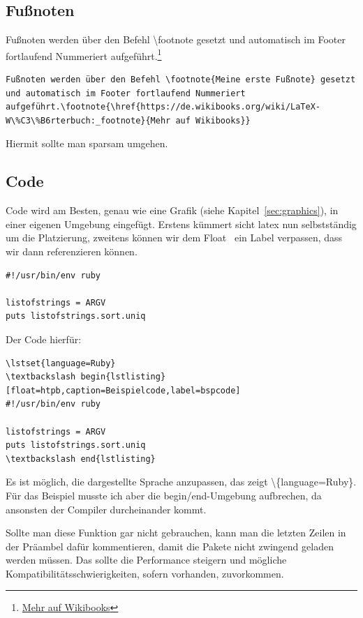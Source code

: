\subsection{Fußnoten}
\label{sec:footn}
Fußnoten werden über den Befehl \textbackslash footnote gesetzt und automatisch im Footer fortlaufend Nummeriert aufgeführt.\footnote{\href{https://de.wikibooks.org/wiki/LaTeX-W\%C3\%B6rterbuch:_footnote}{Mehr auf Wikibooks}}
\begin{lstlisting}
Fußnoten werden über den Befehl \footnote{Meine erste Fußnote} gesetzt und automatisch im Footer fortlaufend Nummeriert aufgeführt.\footnote{\href{https://de.wikibooks.org/wiki/LaTeX-W\%C3\%B6rterbuch:_footnote}{Mehr auf Wikibooks}}
\end{lstlisting}
Hiermit sollte man sparsam umgehen.

\subsection{Code}
\label{sec:code}
Code wird am Besten, genau wie eine Grafik (siehe Kapitel~\ref{sec:graphics}), in einer eigenen Umgebung eingefügt. Erstens kümmert sicht \gls{latex} nun selbstständig um die Platzierung, zweitens können wir dem \glqq Float \grqq\ ein Label verpassen, dass wir dann referenzieren können.

\lstset{language=Ruby}
\begin{lstlisting}[float=htpb,caption=Beispielcode,label=bspcode]
#!/usr/bin/env ruby

listofstrings = ARGV
puts listofstrings.sort.uniq
\end{lstlisting}

Der Code hierfür:
\begin{lstlisting}
\lstset{language=Ruby}
\textbackslash begin{lstlisting}[float=htpb,caption=Beispielcode,label=bspcode]
#!/usr/bin/env ruby

listofstrings = ARGV
puts listofstrings.sort.uniq
\textbackslash end{lstlisting}
\end{lstlisting}
Es ist möglich, die dargestellte Sprache anzupassen, das zeigt \textbackslash\{language=Ruby\}. Für das Beispiel musste ich aber die begin/end-Umgebung aufbrechen, da ansonsten der Compiler durcheinander kommt.

Sollte man diese Funktion gar nicht gebrauchen, kann man die letzten Zeilen in der Präambel dafür kommentieren, damit die Pakete nicht zwingend geladen werden müssen. Das sollte die Performance steigern und mögliche Kompatibilitätsschwierigkeiten, sofern vorhanden, zuvorkommen.

